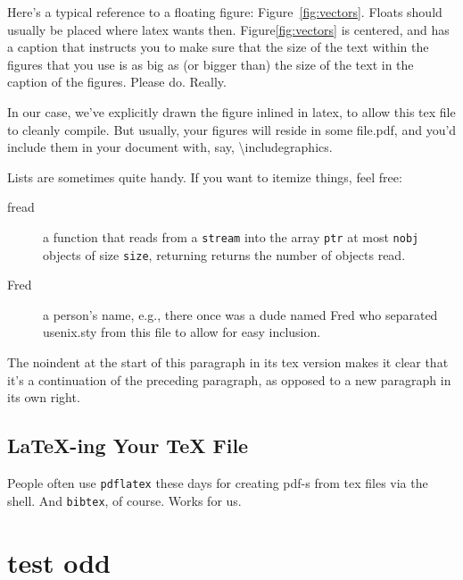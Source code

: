 Here's a typical reference to a floating figure: Figure~\ref{fig:vectors}. Floats should usually be placed where latex wants then. Figure\ref{fig:vectors} is centered, and has a caption that instructs you to make sure that the size of the text within the figures that you use is as big as (or bigger than) the size of the text in the caption of the figures. Please do. Really.\par

In our case, we've explicitly drawn the figure inlined in latex, to allow this tex file to cleanly compile. But usually, your figures will reside in some file.pdf, and you'd include them in your document with, say, \textbackslash{}includegraphics.\par

Lists are sometimes quite handy. If you want to itemize things, feel free:\par

\begin{description}

    \item[fread] a function that reads from a \texttt{stream} into the array \texttt{ptr} at most \texttt{nobj} objects of size \texttt{size}, returning returns the number of objects read.

    \item[Fred] a person's name, e.g., there once was a dude named Fred who separated usenix.sty from this file to allow for easy inclusion.
\end{description}

\noindent
The noindent at the start of this paragraph in its tex version makes it clear that it's a continuation of the preceding paragraph, as opposed to a new paragraph in its own right.\par


\subsection{LaTeX-ing Your TeX File}

People often use \texttt{pdflatex} these days for creating pdf-s from tex files via the shell. And \texttt{bibtex}, of course. Works for us.\par

\section{test odd}
\zhlipsum[9-13]

